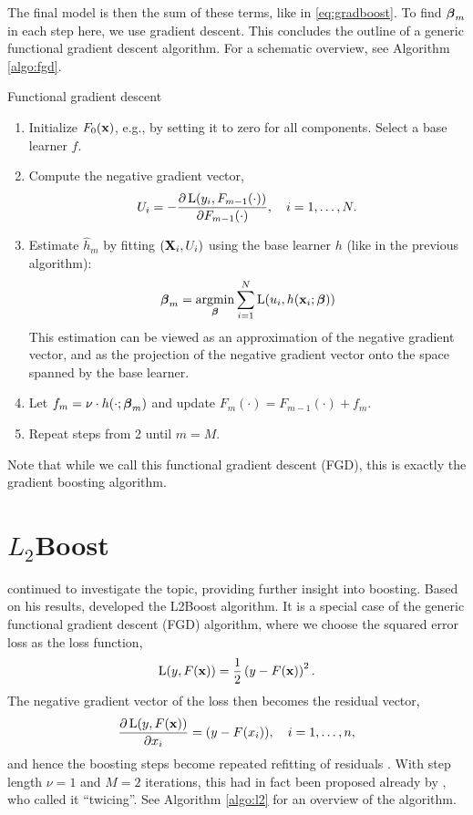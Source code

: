 The final model is then the sum of these terms, like in \eqref{eq:gradboost}. To find $\boldsymbol{\beta}_m$ in each step here, we use gradient descent. This concludes the outline of a generic functional gradient descent algorithm. For a schematic overview, see Algorithm \ref{algo:fgd}.
\begin{algorithm}
\caption{Functional gradient descent}
\label{algo:fgd}
\begin{enumerate}
    \item Initialize $F_0(\mathbf{x})$, e.g., by setting it to zero for all components. Select a base learner $f$.
    \item Compute the negative gradient vector,
        \begin{equation*}
            U_i=-\frac{\partial \operatorname{L}(y_i,F_{m-1}(\cdot))}{\partial F_{m-1}(\cdot)},\quad i=1,\dotsc,N.
        \end{equation*}
    \item Estimate $\hat{h}_m$ by fitting $(\mathbf{X}_i,U_i)$ using the base learner $h$ (like in the previous algorithm):
        \begin{equation*}
            \boldsymbol{\beta}_m=\operatorname*{argmin}_{\boldsymbol{\beta}}\sum_{i=1}^N\operatorname{L}(u_i,h(\mathbf{x}_i;\boldsymbol{\beta}))
        \end{equation*}
        This estimation can be viewed as an approximation of the negative gradient vector, and as the projection of the negative gradient vector onto the space spanned by the base learner.
    \item Let $f_m=\nu\cdot h(\cdot;\boldsymbol{\beta}_m)$ and update $F_m(\cdot)=F_{m-1}(\cdot)+f_m$.
    \item Repeat steps from 2 until $m=M$.
\end{enumerate}
\end{algorithm}
Note that while we call this functional gradient descent (FGD), this is exactly the gradient boosting algorithm.

\section{$L_2$Boost}
\citet{friedman2001} continued to investigate the topic, providing further insight into boosting. Based on his results, \citet{buhlmann-yu} developed the L2Boost algorithm. It is a special case of the generic functional gradient descent (FGD) algorithm, where we choose the squared error loss as the loss function,
\begin{equation*}
    \operatorname{L}(y,F(\mathbf{x}))=\frac{1}{2}\left(y-F(\mathbf{x})\right)^2.
\end{equation*}
The negative gradient vector of the loss then becomes the residual vector,
\begin{equation*}
    \frac{\partial\operatorname{L}(y,F(\mathbf{x}))}{\partial x_i}=(y-F(x_i)),\quad i=1,\dotsc,n,
\end{equation*}
and hence the boosting steps become repeated refitting of residuals \citep{friedman2001,buhlmann-yu}. With step length $\nu=1$ and $M=2$ iterations, this had in fact been proposed already by \citep{tukey}, who called it ``twicing''. See Algorithm \ref{algo:l2} for an overview of the algorithm.


